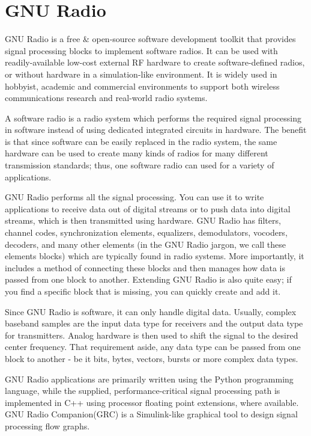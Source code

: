 \documentclass[a4paper,10pt]{article}
\begin{document}


\section{GNU Radio}
GNU Radio\cite{bib:gnuradio} is a free \& open-source software development toolkit
that provides signal processing blocks to implement software radios.
It can be used with readily-available low-cost external RF hardware
to create software-defined radios, or without hardware in a simulation-like environment.
It is widely used in hobbyist, academic and commercial environments 
to support both wireless communications research and real-world radio systems.

A software radio is a radio system which performs the required signal processing 
in software instead of using dedicated integrated circuits in hardware.
The benefit is that since software can be easily replaced in the radio system,
the same hardware can be used to create many kinds of radios for many different transmission standards;
thus, one software radio can used for a variety of applications.

GNU Radio performs all the signal processing.
You can use it to write applications to receive data out of digital streams 
or to push data into digital streams, which is then transmitted using hardware.
GNU Radio has filters, channel codes, synchronization elements, equalizers,
demodulators, vocoders, decoders, and many other elements 
(in the GNU Radio jargon, we call these elements blocks) which are typically found in radio systems.
More importantly, it includes a method of connecting these blocks 
and then manages how data is passed from one block to another.
Extending GNU Radio is also quite easy; if you find a specific block that is missing, you can quickly create and add it.

Since GNU Radio is software, it can only handle digital data.
Usually, complex baseband samples are the input data type for receivers and the output data type for transmitters.
Analog hardware is then used to shift the signal to the desired center frequency.
That requirement aside, any data type can be passed from one block to another 
- be it bits, bytes, vectors, bursts or more complex data types.

GNU Radio applications are primarily written using the Python programming language, 
while the supplied, performance-critical signal processing path is implemented in C++
using processor floating point extensions, where available.
GNU Radio Companion(GRC) is a Simulink-like graphical tool to design signal processing flow graphs.
\end{document}
